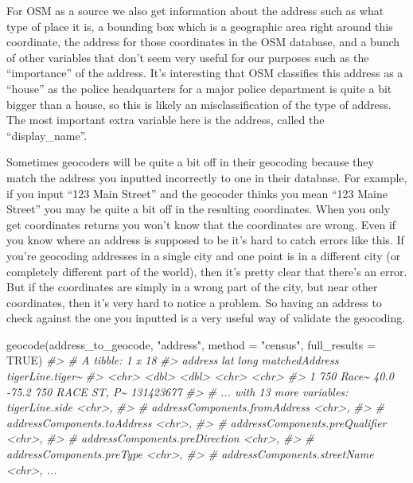 \documentclass[
]{krantz}
\makeatletter
\newenvironment{Shaded}{\begin{snugshade}}{\end{snugshade}}
\newcommand{\AttributeTok}[1]{\textcolor[rgb]{0.61,0.61,0.61}{#1}}
\newcommand{\CommentTok}[1]{\textcolor[rgb]{0.37,0.37,0.37}{\textit{#1}}}
\newcommand{\ConstantTok}[1]{\textcolor[rgb]{0,0,0}{#1}}
\newcommand{\FunctionTok}[1]{\textcolor[rgb]{0,0,0}{#1}}
\newcommand{\NormalTok}[1]{#1}
\newcommand{\StringTok}[1]{\textcolor[rgb]{0.5,0.5,0.5}{#1}}
\newenvironment{kframe}{%
\medskip{}
\setlength{\fboxsep}{.8em}
 \def\at@end@of@kframe{}%
 \ifinner\ifhmode%
  \def\at@end@of@kframe{\end{minipage}}%
  \begin{minipage}{\columnwidth}%
 \fi\fi%
 \def\FrameCommand##1{\hskip\@totalleftmargin \hskip-\fboxsep
 \colorbox{shadecolor}{##1}\hskip-\fboxsep
     \hskip-\linewidth \hskip-\@totalleftmargin \hskip\columnwidth}%
 \MakeFramed {\advance\hsize-\width
   \@totalleftmargin\z@ \linewidth\hsize
   \@setminipage}}%
 {\par\unskip\endMakeFramed%
 \at@end@of@kframe}
\renewenvironment{Shaded}{\begin{kframe}}{\end{kframe}}
\makeatother
\begin{document}
For OSM as a source we also get information about the address such as what type of place it is, a bounding box which is a geographic area right around this coordinate, the address for those coordinates in the OSM database, and a bunch of other variables that don't seem very useful for our purposes such as the ``importance'' of the address. It's interesting that OSM classifies this address as a ``house'' as the police headquarters for a major police department is quite a bit bigger than a house, so this is likely an misclassification of the type of address. The most important extra variable here is the address, called the ``display\_name''.

Sometimes geocoders will be quite a bit off in their geocoding because they match the address you inputted incorrectly to one in their database. For example, if you input ``123 Main Street'' and the geocoder thinks you mean ``123 Maine Street'' you may be quite a bit off in the resulting coordinates. When you only get coordinates returns you won't know that the coordinates are wrong. Even if you know where an address is supposed to be it's hard to catch errors like this. If you're geocoding addresses in a single city and one point is in a different city (or completely different part of the world), then it's pretty clear that there's an error. But if the coordinates are simply in a wrong part of the city, but near other coordinates, then it's very hard to notice a problem. So having an address to check against the one you inputted is a very useful way of validate the geocoding.

\begin{Shaded}
\begin{Highlighting}[]
\FunctionTok{geocode}\NormalTok{(address\_to\_geocode, }\StringTok{"address"}\NormalTok{, }\AttributeTok{method =} \StringTok{"census"}\NormalTok{, }\AttributeTok{full\_results =} \ConstantTok{TRUE}\NormalTok{)}
\CommentTok{\#\textgreater{} \# A tibble: 1 x 18}
\CommentTok{\#\textgreater{}   address     lat  long matchedAddress  tigerLine.tiger\textasciitilde{}}
\CommentTok{\#\textgreater{}   \textless{}chr\textgreater{}     \textless{}dbl\textgreater{} \textless{}dbl\textgreater{} \textless{}chr\textgreater{}           \textless{}chr\textgreater{}           }
\CommentTok{\#\textgreater{} 1 750 Race\textasciitilde{}  40.0 {-}75.2 750 RACE ST, P\textasciitilde{} 131423677       }
\CommentTok{\#\textgreater{} \# ... with 13 more variables: tigerLine.side \textless{}chr\textgreater{},}
\CommentTok{\#\textgreater{} \#   addressComponents.fromAddress \textless{}chr\textgreater{},}
\CommentTok{\#\textgreater{} \#   addressComponents.toAddress \textless{}chr\textgreater{},}
\CommentTok{\#\textgreater{} \#   addressComponents.preQualifier \textless{}chr\textgreater{},}
\CommentTok{\#\textgreater{} \#   addressComponents.preDirection \textless{}chr\textgreater{},}
\CommentTok{\#\textgreater{} \#   addressComponents.preType \textless{}chr\textgreater{},}
\CommentTok{\#\textgreater{} \#   addressComponents.streetName \textless{}chr\textgreater{}, ...}
\end{Highlighting}
\end{Shaded}
\end{document}
